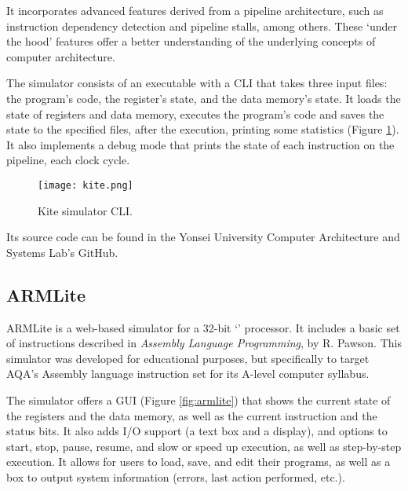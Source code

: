 It incorporates advanced features derived from a \gls{pipeline} architecture, such as \gls{instruction dependency} detection and \gls{pipeline stalls}, among others. These `under the hood' features offer a better understanding of the underlying concepts of computer architecture.

The simulator consists of an executable with a \gls{CLI} that takes three input files: the program's code, the register's state, and the data memory's state. It loads the state of registers and data memory, executes the program's code and saves the state to the specified files, after the execution, printing some statistics (Figure \ref{fig:kite}). It also implements a \gls{debug} mode that prints the state of each instruction on the \gls{pipeline}, each \gls{clock cycle}.

\begin{figure}[h]
  \caption{Kite simulator \gls{CLI}.}
  \texttt{[image: kite.png]}
  \label{fig:kite}
\end{figure}

Its source code can be found in the Yonsei University Computer Architecture and Systems Lab's GitHub\supercite{kiteGH}.


\subsection*{ARMLite}  %
ARMLite\supercite{ARMLite} is a web-based simulator for a 32-bit `' processor. It includes a basic set of instructions described in \textit{Assembly Language Programming}\supercite{PawsonRichard.2020Ass}, by R. Pawson. This simulator was developed for educational purposes, but specifically to target AQA\supercite{AQA}'s Assembly language instruction set for its A-level computer syllabus\supercite{AQAInstructionSet}.

The simulator offers a \gls{GUI} (Figure \ref{fig:armlite}) that shows the current state of the registers and the data memory, as well as the current instruction and the status bits. It also adds \gls{I/O} support (a text box and a display), and options to start, stop, pause, resume, and slow or speed up execution, as well as step-by-step execution. It allows for users to load, save, and edit their programs, as well as a box to output system information (errors, last action performed, etc.).

